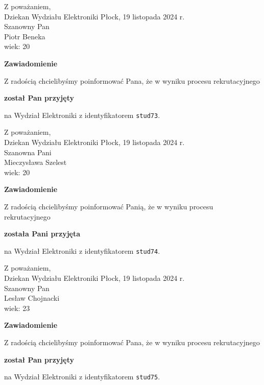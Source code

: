 \documentclass[12pt,a4paper]{article}
\begin{document}
\noindent
Z poważaniem,\\
Dziekan
Wydziału Elektroniki
\newpage
\hfill Płock, 19 listopada 2024 r.\\ 
\noindent 
Szanowny Pan \\
Piotr Beneka \\
wiek: 20

\bigskip

\begin{center}
{\Large\textbf{Zawiadomienie}}
\end{center}
\bigskip
Z radością chcielibyśmy poinformować Pana, że w wyniku procesu rekrutacyjnego
\begin{center}
\textsf{\textbf{został Pan przyjęty}} 
\end{center}
na Wydział Elektroniki z identyfikatorem \verb|stud73|.
\vspace{2cm}

\noindent
Z poważaniem,\\
Dziekan
Wydziału Elektroniki
\newpage
\hfill Płock, 19 listopada 2024 r.\\ 
\noindent 
Szanowna Pani \\
Mieczysława Szelest \\
wiek: 20

\bigskip

\begin{center}
{\Large\textbf{Zawiadomienie}}
\end{center}
\bigskip
Z radością chcielibyśmy poinformować Panią, że w wyniku procesu rekrutacyjnego
\begin{center}
\textsf{\textbf{została Pani przyjęta}} 
\end{center}
na Wydział Elektroniki z identyfikatorem \verb|stud74|.
\vspace{2cm}

\noindent
Z poważaniem,\\
Dziekan
Wydziału Elektroniki
\newpage
\hfill Płock, 19 listopada 2024 r.\\ 
\noindent 
Szanowny Pan \\
Lesław Chojnacki \\
wiek: 23

\bigskip

\begin{center}
{\Large\textbf{Zawiadomienie}}
\end{center}
\bigskip
Z radością chcielibyśmy poinformować Pana, że w wyniku procesu rekrutacyjnego
\begin{center}
\textsf{\textbf{został Pan przyjęty}} 
\end{center}
na Wydział Elektroniki z identyfikatorem \verb|stud75|.
\vspace{2cm}
\end{document}
